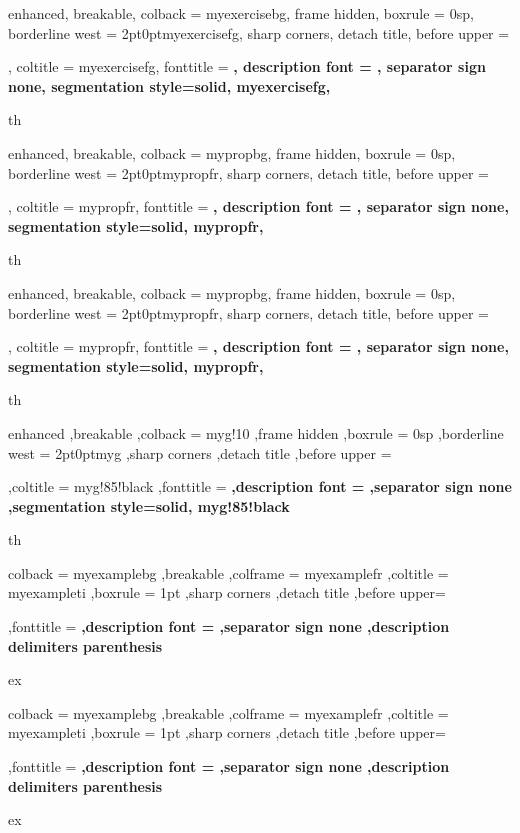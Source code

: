 {%
	enhanced,
	breakable,
	colback = myexercisebg,
	frame hidden,
	boxrule = 0sp,
	borderline west = {2pt}{0pt}{myexercisefg},
	sharp corners,
	detach title,
	before upper = \tcbtitle\par\smallskip,
	coltitle = myexercisefg,
	fonttitle = \bfseries\sffamily,
	description font = \mdseries,
	separator sign none,
	segmentation style={solid, myexercisefg},
}
{th}

{%
	enhanced,
	breakable,
	colback = mypropbg,
	frame hidden,
	boxrule = 0sp,
	borderline west = {2pt}{0pt}{mypropfr},
	sharp corners,
	detach title,
	before upper = \tcbtitle\par\smallskip,
	coltitle = mypropfr,
	fonttitle = \bfseries\sffamily,
	description font = \mdseries,
	separator sign none,
	segmentation style={solid, mypropfr},
}
{th}

{%
	enhanced,
	breakable,
	colback = mypropbg,
	frame hidden,
	boxrule = 0sp,
	borderline west = {2pt}{0pt}{mypropfr},
	sharp corners,
	detach title,
	before upper = \tcbtitle\par\smallskip,
	coltitle = mypropfr,
	fonttitle = \bfseries\sffamily,
	description font = \mdseries,
	separator sign none,
	segmentation style={solid, mypropfr},
}
{th}

{%
	enhanced
	,breakable
	,colback = myg!10
	,frame hidden
	,boxrule = 0sp
	,borderline west = {2pt}{0pt}{myg}
	,sharp corners
	,detach title
	,before upper = \tcbtitle\par\smallskip
	,coltitle = myg!85!black
	,fonttitle = \bfseries\sffamily
	,description font = \mdseries
	,separator sign none
	,segmentation style={solid, myg!85!black}
}
{th}


{%
	colback = myexamplebg
	,breakable
	,colframe = myexamplefr
	,coltitle = myexampleti
	,boxrule = 1pt
	,sharp corners
	,detach title
	,before upper=\tcbtitle\par\smallskip
	,fonttitle = \bfseries
	,description font = \mdseries
	,separator sign none
	,description delimiters parenthesis
}
{ex}

{%
	colback = myexamplebg
	,breakable
	,colframe = myexamplefr
	,coltitle = myexampleti
	,boxrule = 1pt
	,sharp corners
	,detach title
	,before upper=\tcbtitle\par\smallskip
	,fonttitle = \bfseries
	,description font = \mdseries
	,separator sign none
	,description delimiters parenthesis
}
{ex}

